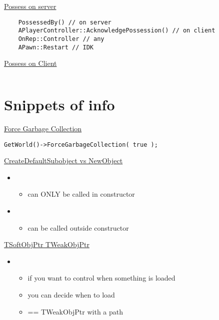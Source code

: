     \uline{Possess on server}
        \begin{lstlisting}
    PossessedBy() // on server
    APlayerController::AcknowledgePossession() // on client
    OnRep::Controller // any
    APawn::Restart // IDK
        \end{lstlisting}


    \uline{Possess on Client}
        \begin{lstlisting}
        \end{lstlisting}

    \section{Snippets of info}
    \uline{Force Garbage Collection}
    \begin{lstlisting}
GetWorld()->ForceGarbageCollection( true );
    \end{lstlisting}

        \uline{CreateDefaultSubobject vs NewObject}
            \begin{itemize}
                \item {}
                \begin{itemize}
                    \item can ONLY be called in constructor
                \end{itemize}
            \end{itemize}
            \begin{itemize}
                \item {}
                \begin{itemize}
                    \item can be called outside constructor
                \end{itemize}
            \end{itemize}

        \uline{TSoftObjPtr TWeakObjPtr}
        \begin{itemize}
            \item {}
            \begin{itemize}
                \item if you want to control when something is loaded
                \item you can decide when to load
                \item == TWeakObjPtr with a path
            \end{itemize}
        \end{itemize}

